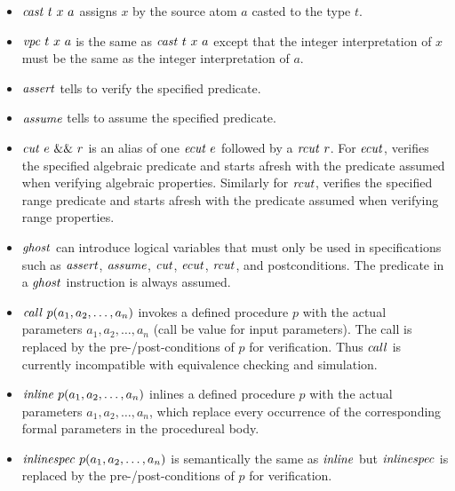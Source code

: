 \documentclass{article}
\begin{document}
\begin{itemize}
\item $\mathit{cast}\ t\ x\ a$ assigns $x$ by the source atom $a$ casted to the
  type $t$.
\item $\mathit{vpc}\ t\ x\ a$ is the same as $\mathit{cast}\ t\ x\ a$ except that
  the integer interpretation of $x$ must be the same as the integer
  interpretation of $a$.
\item $\mathit{assert}$ tells \cryptoline to verify the specified predicate.
\item $\mathit{assume}$ tells \cryptoline to assume the specified predicate.
\item $\mathit{cut}\ e\ \&\&\ r$ is an alias of one $\mathit{ecut}\ e$ followed by
  a $\mathit{rcut}\ r$.
  For $\mathit{ecut}$, \cryptoline verifies the specified algebraic predicate
  and starts afresh with the predicate assumed when verifying algebraic
  properties.
  Similarly for $\mathit{rcut}$, \cryptoline verifies the specified range
  predicate and starts afresh with the predicate assumed when verifying
  range properties.
\item $\mathit{ghost}$ can introduce logical variables that must only be used
  in specifications such as $\mathit{assert}$, $\mathit{assume}$, $\mathit{cut}$, $\mathit{ecut}$,
  $\mathit{rcut}$, and postconditions.
  The predicate in a $\mathit{ghost}$ instruction is always assumed.
\item $\mathit{call}\ p(a_1, a_2, \ldots, a_n)$ invokes a defined
  procedure $p$ with the actual parameters $a_1, a_2, \ldots, a_n$
  (call be value for input parameters).
  The call is replaced by the pre-/post-conditions of $p$ for
  verification.
  Thus $\mathit{call}$ is currently incompatible with equivalence checking
  and simulation.
\item $\mathit{inline}\ p(a_1, a_2, \ldots, a_n)$ inlines a defined
  procedure $p$ with the actual parameters $a_1, a_2, \ldots, a_n$,
  which replace every occurrence of the corresponding formal
  parameters in the procedureal body.
\item $\mathit{inlinespec}\ p(a_1, a_2, \ldots, a_n)$ is semantically the
  same as $\mathit{inline}$ but $\mathit{inlinespec}$ is replaced by the
  pre-/post-conditions of $p$ for verification.
\end{itemize}
\end{document}
